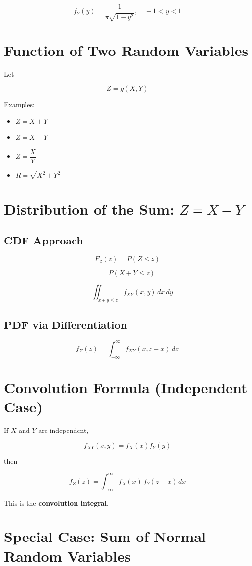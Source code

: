 \documentclass[12pt]{article}
\begin{document}
\[
\boxed{
f_Y(y)=\frac{1}{\pi\sqrt{1-y^2}}, \quad -1<y<1
}
\]

\section{Function of Two Random Variables}

Let

\[
Z = g(X,Y)
\]

Examples:

\begin{itemize}
\item $Z = X + Y$
\item $Z = X - Y$
\item $Z = \dfrac{X}{Y}$
\item $R = \sqrt{X^2 + Y^2}$
\end{itemize}

\section{Distribution of the Sum: $Z=X+Y$}

\subsection*{CDF Approach}

\[
F_Z(z) = P(Z \le z)
\]

\[
= P(X+Y \le z)
\]

\[
= \iint_{x+y \le z} f_{XY}(x,y)\,dx\,dy
\]

\subsection*{PDF via Differentiation}

\[
f_Z(z)=\int_{-\infty}^{\infty} f_{XY}(x,z-x)\,dx
\]

\section{Convolution Formula (Independent Case)}

If $X$ and $Y$ are independent,

\[
f_{XY}(x,y)=f_X(x)f_Y(y)
\]

then

\[
\boxed{
f_Z(z)=\int_{-\infty}^{\infty} f_X(x)\,f_Y(z-x)\,dx
}
\]

This is the \textbf{convolution integral}.

\section{Special Case: Sum of Normal Random Variables}
\end{document}
